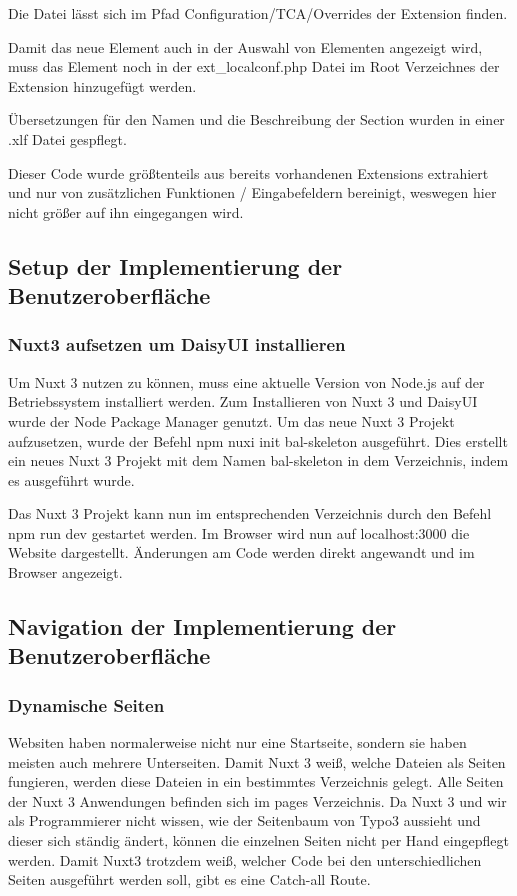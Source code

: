 Die Datei lässt sich im Pfad Configuration/TCA/Overrides der Extension finden.

Damit das neue Element auch in der Auswahl von Elementen angezeigt wird, muss das Element noch in der ext\_localconf.php Datei im Root Verzeichnes der Extension hinzugefügt werden. 

Übersetzungen für den Namen und die Beschreibung der Section wurden in einer .xlf Datei gespflegt.

Dieser Code wurde größtenteils aus bereits vorhandenen Extensions extrahiert und nur von zusätzlichen Funktionen / Eingabefeldern bereinigt, weswegen hier nicht größer auf ihn eingegangen wird.

\subsection{Setup der Implementierung der Benutzeroberfläche}
\label{sec:Setup der ImplementierungBenutzeroberflaeche}

\subsubsection{Nuxt3 aufsetzen um DaisyUI installieren}
\label{sec:Nuxt3 aufsetzen um DaisyUI installieren}
Um Nuxt 3 nutzen zu können, muss eine aktuelle Version von Node.js auf der Betriebssystem installiert werden. Zum Installieren von Nuxt 3 und DaisyUI wurde der Node Package Manager genutzt. Um das neue Nuxt 3 Projekt aufzusetzen, wurde der Befehl npm nuxi init bal-skeleton ausgeführt. Dies erstellt ein neues Nuxt 3 Projekt mit dem Namen bal-skeleton in dem Verzeichnis, indem es ausgeführt wurde. 

Das Nuxt 3 Projekt kann nun im entsprechenden Verzeichnis durch den Befehl npm run dev gestartet werden. Im Browser wird nun auf localhost:3000 die Website dargestellt. Änderungen am Code werden direkt angewandt und im Browser angezeigt.

\subsection{Navigation der Implementierung der Benutzeroberfläche}
\label{sec:Navigation der der ImplementierungBenutzeroberflaeche}

\subsubsection{Dynamische Seiten}
\label{sec:Dynamische Seiten}
Websiten haben normalerweise nicht nur eine Startseite, sondern sie haben meisten auch mehrere Unterseiten. Damit Nuxt 3 weiß, welche Dateien als Seiten fungieren, werden diese Dateien in ein bestimmtes Verzeichnis gelegt. Alle Seiten der Nuxt 3 Anwendungen befinden sich im pages Verzeichnis. Da Nuxt 3 und wir als Programmierer nicht wissen, wie der Seitenbaum von Typo3 aussieht und dieser sich ständig ändert, können die einzelnen Seiten nicht per Hand eingepflegt werden. Damit Nuxt3 trotzdem weiß, welcher Code bei den unterschiedlichen Seiten ausgeführt werden soll, gibt es eine Catch-all Route.

